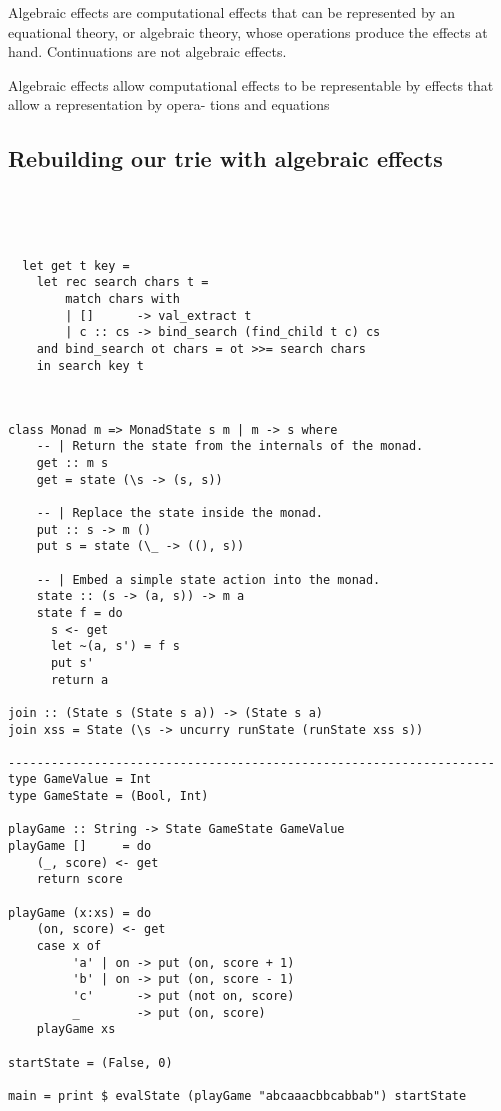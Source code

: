 Algebraic effects are computational effects that can be represented by an equational theory, or algebraic theory, whose operations produce the effects at hand.
Continuations are not algebraic effects.

Algebraic effects allow computational effects to be representable by
effects that allow a representation by opera- tions and equations

\subsection{Rebuilding our trie with algebraic effects}
\begin{verbatim}




  let get t key =
    let rec search chars t =
        match chars with
        | []      -> val_extract t
        | c :: cs -> bind_search (find_child t c) cs
    and bind_search ot chars = ot >>= search chars
    in search key t



\end{verbatim}



\begin{verbatim}
class Monad m => MonadState s m | m -> s where
    -- | Return the state from the internals of the monad.
    get :: m s
    get = state (\s -> (s, s))

    -- | Replace the state inside the monad.
    put :: s -> m ()
    put s = state (\_ -> ((), s))

    -- | Embed a simple state action into the monad.
    state :: (s -> (a, s)) -> m a
    state f = do
      s <- get
      let ~(a, s') = f s
      put s'
      return a

join :: (State s (State s a)) -> (State s a)
join xss = State (\s -> uncurry runState (runState xss s))

--------------------------------------------------------------------
type GameValue = Int
type GameState = (Bool, Int)

playGame :: String -> State GameState GameValue
playGame []     = do
    (_, score) <- get
    return score

playGame (x:xs) = do
    (on, score) <- get
    case x of
         'a' | on -> put (on, score + 1)
         'b' | on -> put (on, score - 1)
         'c'      -> put (not on, score)
         _        -> put (on, score)
    playGame xs

startState = (False, 0)

main = print $ evalState (playGame "abcaaacbbcabbab") startState
\end{verbatim}

